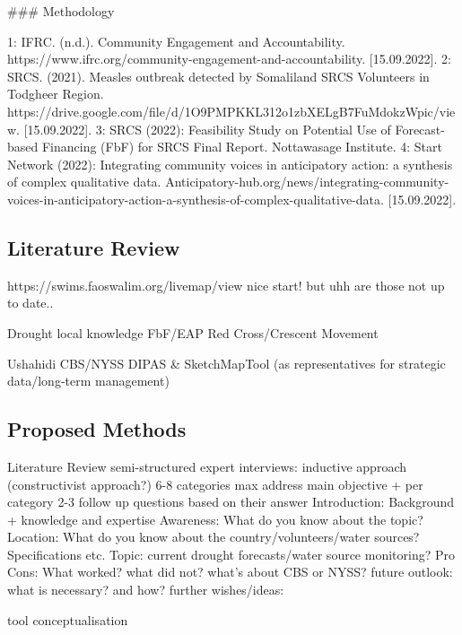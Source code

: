 \#\#\# Methodology



1: IFRC. (n.d.). Community Engagement and Accountability. https://www.ifrc.org/community-engagement-and-accountability. [15.09.2022].
2: SRCS. (2021). Measles outbreak detected by Somaliland SRCS Volunteers in Todgheer Region. https://drive.google.com/file/d/1O9PMPKKL312o1zbXELgB7FuMdokzWpic/view. [15.09.2022].
3: SRCS (2022): Feasibility Study on Potential Use of Forecast-based Financing (FbF) for SRCS Final Report. Nottawasage Institute.
4: Start Network (2022): Integrating community voices in anticipatory action: a synthesis of complex qualitative data. Anticipatory-hub.org/news/integrating-community-voices-in-anticipatory-action-a-synthesis-of-complex-qualitative-data. [15.09.2022].


\subsection{Literature Review}
https://swims.faoswalim.org/livemap/view nice start! but uhh are those not up to date..

Drought
local knowledge
FbF/EAP
Red Cross/Crescent Movement

Ushahidi
CBS/NYSS
DIPAS \& SketchMapTool (as representatives for strategic data/long-term management)


\subsection{Proposed Methods}

Literature Review
semi-structured expert interviews: inductive approach (constructivist approach?)
6-8 categories max
address main objective + per category 2-3 follow up questions based on their answer
Introduction: Background + knowledge and expertise
Awareness: What do you know about the topic?
Location: What do you know about the country/volunteers/water sources? Specifications etc.
Topic: current drought forecasts/water source monitoring?
Pro Cons: What worked? what did not? what's about CBS or NYSS?
future outlook: what is necessary? and how?
further wishes/ideas:

tool conceptualisation



